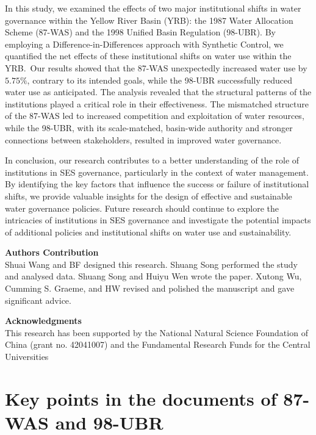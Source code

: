 \documentclass[preprint, 12pt]{elsarticle}
\begin{document}
In this study, we examined the effects of two major institutional shifts in water governance within the Yellow River Basin (YRB): the 1987 Water Allocation Scheme (87-WAS) and the 1998 Unified Basin Regulation (98-UBR). By employing a Difference-in-Differences approach with Synthetic Control, we quantified the net effects of these institutional shifts on water use within the YRB.\
Our results showed that the 87-WAS unexpectedly increased water use by $5.75\%$, contrary to its intended goals, while the 98-UBR successfully reduced water use as anticipated. The analysis revealed that the structural patterns of the institutions played a critical role in their effectiveness. The mismatched structure of the 87-WAS led to increased competition and exploitation of water resources, while the 98-UBR, with its scale-matched, basin-wide authority and stronger connections between stakeholders, resulted in improved water governance.

In conclusion, our research contributes to a better understanding of the role of institutions in SES governance, particularly in the context of water management. By identifying the key factors that influence the success or failure of institutional shifts, we provide valuable insights for the design of effective and sustainable water governance policies. Future research should continue to explore the intricacies of institutions in SES governance and investigate the potential impacts of additional policies and institutional shifts on water use and sustainability.

\textbf{Authors Contribution}\\
Shuai Wang and BF designed this research. Shuang Song performed the study and analysed data. Shuang Song and Huiyu Wen wrote the paper. Xutong Wu, Cumming S. Graeme, and HW revised and polished the manuscript and gave significant advice.

\textbf{Acknowledgments}\\
This research has been supported by the National Natural Science Foundation of China (grant no. 42041007) and the Fundamental Research Funds for the Central Universities


\label{bib}

\newpage
\appendix\label{appendix}

\section{Key points in the documents of 87-WAS and 98-UBR}\label{secS1}
\renewcommand{\thefigure}{A\arabic{figure}}
\renewcommand{\thetable}{A\arabic{table}}
\setcounter{figure}{0}
\setcounter{table}{0}
\end{document}
